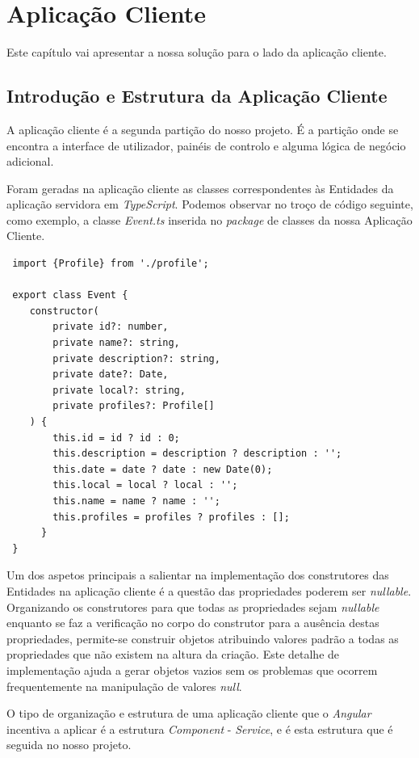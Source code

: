 %

\chapter{Aplicação Cliente} \label{cliente}

Este capítulo vai apresentar a nossa solução para o lado da aplicação cliente.

\section{Introdução e Estrutura da Aplicação Cliente} \label{sec41}
A aplicação cliente é a segunda partição do nosso projeto. É a partição onde se encontra a interface de utilizador, painéis de controlo e alguma lógica de negócio adicional.

Foram geradas na aplicação cliente as classes correspondentes às Entidades da aplicação servidora em \emph{TypeScript}. Podemos observar no troço de código seguinte, como exemplo, a classe \emph{Event.ts} inserida no \emph{package} de classes da nossa Aplicação Cliente.

\begin{lstlisting}
 import {Profile} from './profile';

 export class Event {
 	constructor(
		private id?: number,
		private name?: string,
		private description?: string,
		private date?: Date,
		private local?: string,
		private profiles?: Profile[]
 	) {
		this.id = id ? id : 0;
		this.description = description ? description : '';
		this.date = date ? date : new Date(0);
		this.local = local ? local : '';
		this.name = name ? name : '';
		this.profiles = profiles ? profiles : [];
	  }
 }
\end{lstlisting}

Um dos aspetos principais a salientar na implementação dos construtores das Entidades na aplicação cliente é a questão das propriedades poderem ser \emph{nullable}. Organizando os construtores para que todas as propriedades sejam \emph{nullable} enquanto se faz a verificação no corpo do construtor para a ausência destas propriedades, permite-se construir objetos atribuindo valores padrão a todas as propriedades que não existem na altura da criação. Este detalhe de implementação ajuda a gerar objetos vazios sem os problemas que ocorrem frequentemente na manipulação de valores \emph{null}.


O tipo de organização e estrutura de uma aplicação cliente que o \emph{Angular} incentiva a aplicar é a estrutura \emph{Component} - \emph{Service}, e é esta estrutura que é seguida no nosso projeto.\\

